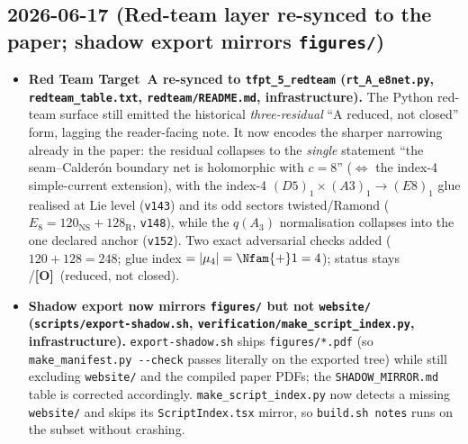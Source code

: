 \documentclass[11pt]{article}
\providecommand{\mO}{\textbf{[O]}}\providecommand{\mX}{\textbf{[X]}}
\providecommand{\vref}[1]{\texttt{#1}}
\begin{document}
\subsection*{2026-06-17 (Red-team layer re-synced to the paper; shadow export mirrors \texttt{figures/})}
\begin{itemize}
\item \textbf{Red Team Target~A re-synced to \texttt{tfpt\_5\_redteam} (\texttt{rt\_A\_e8net.py},
  \texttt{redteam\_table.txt}, \texttt{redteam/README.md}, infrastructure).} The Python red-team
  surface still emitted the historical \emph{three-residual} ``A reduced, not closed'' form, lagging the
  reader-facing note. It now encodes the sharper narrowing already in the paper: the residual collapses to
  the \emph{single} statement ``the seam--Calder\'on boundary net is holomorphic with $c=8$'' ($\Leftrightarrow$
  the index-4 simple-current extension), with the index-4 $(D5)_1\times(A3)_1\to(E8)_1$ glue realised at Lie
  level (\vref{v143}) and its odd sectors twisted/Ramond ($E_8=120_{\mathrm{NS}}+128_{\mathrm{R}}$, \vref{v148}),
  while the $q(A_3)$ normalisation collapses into the one declared anchor (\vref{v152}). Two exact adversarial
  checks added ($120{+}128=248$; glue index $=|\mu_4|=\Nfam{+}1=4$); status stays \mC/\mO\ (reduced, not closed).
\item \textbf{Shadow export now mirrors \texttt{figures/} but not \texttt{website/}
  (\texttt{scripts/export-shadow.sh}, \texttt{verification/make\_script\_index.py}, infrastructure).}
  \texttt{export-shadow.sh} ships \texttt{figures/*.pdf} (so \texttt{make\_manifest.py -{}-check} passes
  literally on the exported tree) while still excluding \texttt{website/} and the compiled paper PDFs; the
  \texttt{SHADOW\_MIRROR.md} table is corrected accordingly. \texttt{make\_script\_index.py} now detects a
  missing \texttt{website/} and skips its \texttt{ScriptIndex.tsx} mirror, so \texttt{build.sh notes} runs on
  the subset without crashing.
\end{itemize}
\end{document}

